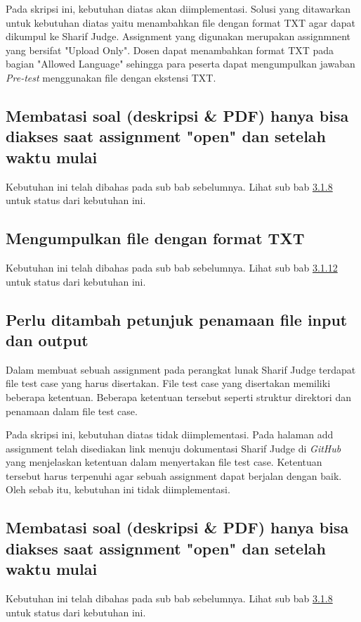 Pada skripsi ini, kebutuhan diatas akan diimplementasi. Solusi yang ditawarkan untuk kebutuhan diatas yaitu menambahkan file dengan format TXT agar dapat dikumpul ke Sharif Judge. Assignment yang digunakan merupakan assignmnent yang bersifat "Upload Only". Dosen dapat menambahkan format TXT pada bagian "Allowed Language" sehingga para peserta dapat mengumpulkan jawaban \textit{Pre-test} menggunakan file dengan ekstensi TXT.

\subsection{Membatasi soal (deskripsi \& PDF) hanya bisa diakses saat assignment "open" dan setelah waktu mulai}
Kebutuhan ini telah dibahas pada sub bab sebelumnya. Lihat sub bab \hyperref[subsec:membatasisoal]{3.1.8} untuk status dari kebutuhan ini.

\subsection{Mengumpulkan file dengan format TXT}
Kebutuhan ini telah dibahas pada sub bab sebelumnya. Lihat sub bab \hyperref[subsec:filetxt]{3.1.12} untuk status dari kebutuhan ini.

\subsection{Perlu ditambah petunjuk penamaan file input dan output}
Dalam membuat sebuah assignment pada perangkat lunak Sharif Judge terdapat file test case yang harus disertakan. File test case yang disertakan memiliki beberapa ketentuan. Beberapa ketentuan tersebut seperti struktur direktori dan penamaan dalam file test case. 

Pada skripsi ini, kebutuhan diatas tidak diimplementasi. Pada halaman add assignment telah disediakan link menuju dokumentasi Sharif Judge di \textit{GitHub} yang menjelaskan ketentuan dalam menyertakan file test case. Ketentuan tersebut harus terpenuhi agar sebuah assignment dapat berjalan dengan baik. Oleh sebab itu, kebutuhan ini tidak diimplementasi.

\subsection{Membatasi soal (deskripsi \& PDF) hanya bisa diakses saat assignment "open" dan setelah waktu mulai}
Kebutuhan ini telah dibahas pada sub bab sebelumnya. Lihat sub bab \hyperref[subsec:membatasisoal]{3.1.8} untuk status dari kebutuhan ini.

